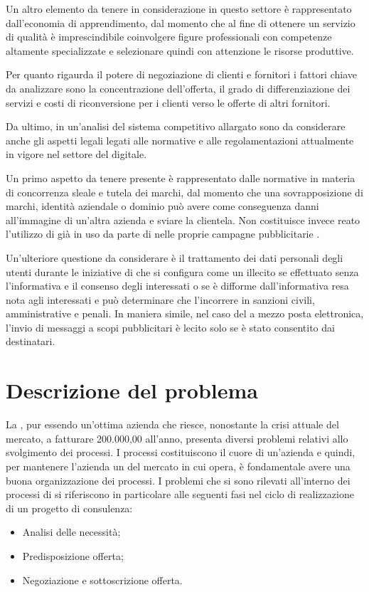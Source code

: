 Un altro elemento da tenere in considerazione in questo settore è rappresentato dall'economia di apprendimento, dal momento che al fine di ottenere un servizio di qualità è imprescindibile coinvolgere figure professionali con competenze altamente specializzate e selezionare quindi con attenzione le risorse produttive.

Per quanto rigaurda il potere di negoziazione di clienti e  fornitori i fattori chiave da analizzare sono la concentrazione dell'offerta, il grado di differenziazione dei servizi e costi di riconversione per i clienti verso le offerte di altri fornitori.

Da ultimo, in un'analisi del sistema competitivo allargato sono da considerare anche gli aspetti legali legati alle normative e alle regolamentazioni attualmente in vigore nel settore del \mktg digitale.

Un primo aspetto da tenere presente è rappresentato dalle normative in materia di concorrenza sleale e tutela dei marchi, dal momento che una sovrapposizione di marchi, identità aziendale o dominio  può avere come conseguenza danni all'immagine di un'altra azienda e sviare la clientela. Non costituisce invece reato l'utilizzo di  già in uso da parte di  nelle proprie campagne pubblicitarie .

Un'ulteriore questione da considerare è il trattamento dei dati personali degli utenti durante le iniziative di \mktg che si configura come un illecito se effettuato senza l'informativa e il consenso degli interessati o se è difforme dall'informativa resa nota agli interessati e può determinare che l'incorrere in sanzioni civili, amministrative e penali. In maniera simile, nel caso del \mktg a mezzo posta elettronica, l'invio di messaggi a scopi pubblicitari è lecito solo se è stato consentito dai destinatari.

\section{Descrizione del problema}
La \customer , pur essendo un'ottima azienda che riesce, nonostante la crisi attuale del mercato, a fatturare  200.000,00 \text{\euro} all'anno, presenta diversi problemi relativi allo svolgimento dei processi.
I processi costituiscono il cuore di un'azienda e quindi, per mantenere l'azienda un  del mercato in cui opera, è fondamentale avere una buona organizzazione dei processi.
I problemi che si sono rilevati all'interno dei processi di \customer si riferiscono in particolare alle seguenti fasi nel ciclo di realizzazione di un progetto di consulenza:
\begin{itemize}
	\item Analisi delle necessità;
	\item Predisposizione offerta;
	\item Negoziazione e sottoscrizione offerta.
\end{itemize}

